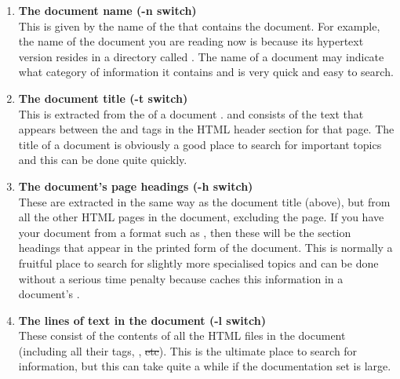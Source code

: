 \begin{enumerate}

\item \label{sect:searchname}{\bf The document name (-n
switch)}\mbox{}\\ This is given by the name of the
 that contains the
document.
For example, the name of the document you are reading now is
 because its hypertext version resides in
a directory called . The name of a document may
indicate what category of information it contains and is very quick
and easy to search.

\item \label{sect:searchtitle}{\bf The document title (-t
switch)}\mbox{}\\ This is extracted from the  of a document
.
and consists of the text that appears between the  and
 tags in the HTML header section for that page. The
title of a document is obviously a good place to search for important
topics and this can be done quite quickly.

\item \label{sect:searchheading}{\bf The document's page headings (-h
switch)}\mbox{}\\ These are extracted in the same way as the document
title (above), but from all the other HTML pages in the document,
excluding the  page. If you have
 your document from a
format such as 
,
then these will be the section headings
that appear in the printed form of the document. This is normally a
fruitful place to search for slightly more specialised topics and can
be done without a serious time penalty because 
caches this information in a document's .

\item \label{sect:searchline}{\bf The lines of text in the document (-l switch)}\mbox{}\\
These consist of the contents of all the HTML files in the document
(including all their  tags, ,
\st{etc}). This is the ultimate place to search for information, but
this can take quite a while if the documentation set is large.

\end{enumerate}


